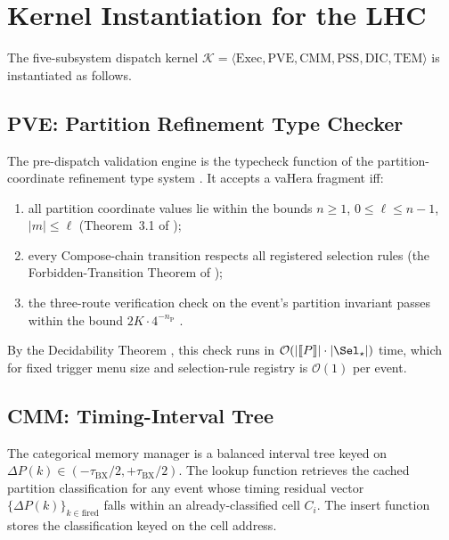 \documentclass[twocolumn,10pt,a4paper]{article}
\theoremstyle{thmstyle}
\theoremstyle{definition}
\theoremstyle{remark}
\newcommand{\nP}{n_{\mathrm{P}}}
\newcommand{\tBX}{\tau_{\mathrm{BX}}}
\newcommand{\DeltaP}{\Delta P}
\newcommand{\Kernel}{\mathcal{K}}
\begin{document}
\section{Kernel Instantiation for the LHC}
\label{sec:kernel_instantiation}

The five-subsystem dispatch kernel $\Kernel = \langle\text{Exec}, \text{PVE},
\text{CMM}, \text{PSS}, \text{DIC}, \text{TEM}\rangle$
\citep{companion:kernel} is instantiated as follows.

\subsection{PVE: Partition Refinement Type Checker}

The pre-dispatch validation engine is the $\mathrm{typecheck}$ function
of the partition-coordinate refinement type system \citep{companion:types}.
It accepts a vaHera fragment iff:
\begin{enumerate}[nosep,label=(\roman*)]
\item all partition coordinate values lie within the bounds
  $n \geq 1$, $0 \leq \ell \leq n-1$, $|m| \leq \ell$
  (Theorem~3.1 of \citealt{companion:types});
\item every Compose-chain transition respects all registered selection rules
  (the Forbidden-Transition Theorem of \citealt{companion:types});
\item the three-route verification check on the event's partition invariant
  passes within the bound $2K \cdot 4^{-\nP}$ \citep{companion:verification}.
\end{enumerate}
By the Decidability Theorem \citep{companion:types}, this check runs in
$\mathcal{O}(|\llbracket P \rrbracket| \cdot |\Sel_\star|)$ time, which
for fixed trigger menu size and selection-rule registry is $\mathcal{O}(1)$
per event.

\subsection{CMM: Timing-Interval Tree}

The categorical memory manager is a balanced interval tree keyed on
$\DeltaP(k) \in (-\tBX/2, +\tBX/2)$. The lookup function retrieves the
cached partition classification for any event whose timing residual vector
$\{\DeltaP(k)\}_{k\in\text{fired}}$ falls within an already-classified cell
$C_i$. The insert function stores the classification keyed on the cell address.
\end{document}
